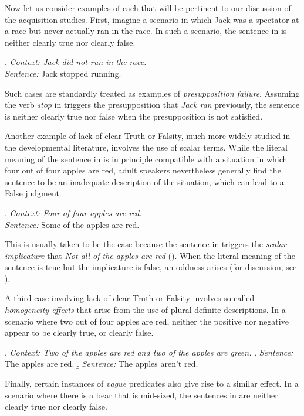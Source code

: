 \documentclass[12pt, letterpaper]{article}
\begin{document}
Now let us consider examples of each that will be pertinent to our discussion of the acquisition studies. First, imagine a scenario in which Jack was a spectator at a race but never actually ran in the race. In such a scenario, the sentence in \Next is neither clearly true nor clearly false.

\ex. \label{presup} \textit{Context: Jack did not run in the race.} \\
\textit{Sentence:} Jack stopped running.

Such cases are standardly treated as examples of \textit{presupposition failure}. Assuming the verb \textit{stop} in \Last triggers the presupposition that \textit{Jack ran} previously, the sentence is neither clearly true nor false when the presupposition is not satisfied. 

Another example of lack of clear Truth or Falsity, much more widely studied in the developmental literature, involves the use of scalar terms. While the literal meaning of the sentence in \Next is in principle compatible with a situation in which four out of four apples are red, adult speakers nevertheless generally find the sentence to be an inadequate description of the situation, which can lead to a False judgment.

\ex. \label{si} \textit{Context: Four of four apples are red.} \\
\textit{Sentence:} Some of the apples are red.

This is usually taken to be the case because the sentence in \Last triggers the \textit{scalar implicature} that \textit{Not all of the apples are red} (\citealt{Grice:1975}). When the literal meaning of the sentence is true but the implicature is false, an oddness arises (for discussion, see \citealt{Magri:2009,Magri:2014}). 

A third case involving lack of clear Truth or Falsity involves so-called \textit{homogeneity effects} that arise from the use of plural definite descriptions. In a scenario where two out of four apples are red, neither the positive \Next[a] nor negative \Next[b] appear to be clearly true, or clearly false.

\ex. \label{hmg} \textit{Context: Two of the apples are red and two of the apples are green.} 
\a. \textit{Sentence:} The apples are red.
\b. \textit{Sentence:} The apples aren't red.

Finally, certain instances of \textit{vague} predicates also give rise to a similar effect. In a scenario where there is a bear that is mid-sized, the sentences in \Next are neither clearly true nor clearly false. 
\end{document}
